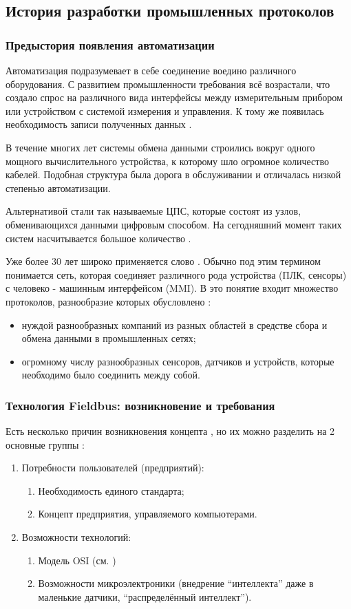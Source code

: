 \subsection{История разработки промышленных протоколов}
\subsubsection{Предыстория появления автоматизации}
Автоматизация подразумевает в себе соединение воедино различного оборудования. С развитием промышленности требования всё возрастали, что создало спрос на различного вида интерфейсы между измерительным прибором или устройством с системой измерения и управления. К тому же появилась необходимость записи полученных данных \cite{van_gorp_advanced_2009}. 


В течение многих лет системы обмена данными строились вокруг одного мощного вычислительного устройства, к которому шло огромное количество кабелей. Подобная структура была дорога в обслуживании и отличалась низкой степенью автоматизации. 

Альтернативой стали так называемые ЦПС, которые состоят из узлов, обменивающихся данными цифровым способом. На сегодняшний момент таких систем насчитывается большое количество \cite{__2002}.

Уже более 30 лет широко применяется слово \fb. Обычно под этим термином понимается сеть, которая соединяет различного рода устройства (ПЛК, сенсоры) с человеко - машинным интерфейсом (MMI). В это понятие входит множество протоколов, разнообразие которых обусловлено \cite{thomesse_fieldbus_2005}:
\begin{itemize}
	\item нуждой разнообразных компаний из разных областей в средстве сбора и обмена данными в промышленных сетях;
	\item огромному числу разнообразных сенсоров, датчиков и устройств, которые необходимо  было соединить между собой.
\end{itemize}
\subsubsection{Технология Fieldbus: возникновение и требования}
Есть несколько причин возникновения концепта \fb, но их можно разделить на 2 основные группы \cite{thomesse_fieldbus_2005}:
\begin{enumerate}
	\item Потребности пользователей (предприятий):
	\begin{enumerate}
		\item Необходимость единого стандарта;
		\item Концепт предприятия, управляемого компьютерами.
	\end{enumerate}
	\item Возможности технологий:
	\begin{enumerate}
		\item Модель OSI (см. )
		\item Возможности микроэлектроники (внедрение ``интеллекта'' даже в маленькие датчики, ``распределённый интеллект'').
	\end{enumerate}
\end{enumerate}

